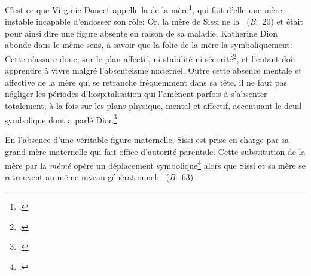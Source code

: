 C'est ce que Virginie Doucet appelle la  de la mère\footcite[79]{Doucet2007}, qui fait d'elle une mère instable incapable d'endosser son rôle: 
Or, la mère de Sissi ne la ~(\textit{B}:~20) et était pour ainsi dire une figure absente en raison de sa maladie.
Katherine Dion abonde dans le même sens, à savoir que la folie de la mère la  symboliquement: 
Cette  n'assure donc, sur le plan affectif, ni stabilité ni sécurité\footcite[31]{Leduc2010}, et l'enfant doit apprendre à vivre malgré l'absentéisme maternel.
Outre cette absence mentale et affective de la mère qui se retranche fréquemment dans sa tête, il ne faut pas négliger les périodes d'hospitalisation qui l'amènent parfois à s'absenter totalement, à la fois sur les plans physique, mental et affectif, accentuant le deuil symbolique dont a parlé Dion\footcite[36]{Dion2010}.
\par
En l'absence d'une véritable figure maternelle, Sissi est prise en charge par sa grand-mère maternelle qui fait office d'autorité parentale.
Cette substitution de la mère par la \textit{mémé} opère un déplacement symbolique\footcite[33]{Leduc2010} alors que Sissi et sa mère se retrouvent au même niveau générationnel: ~(\textit{B}:~63)


